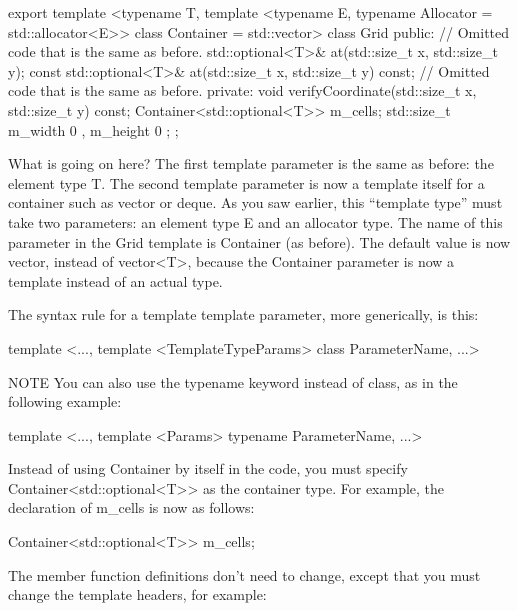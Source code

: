 \begin{cpp}
export template <typename T,
    template <typename E, typename Allocator = std::allocator<E>> class Container
        = std::vector>
class Grid
{
    public:
        // Omitted code that is the same as before.
        std::optional<T>& at(std::size_t x, std::size_t y);
        const std::optional<T>& at(std::size_t x, std::size_t y) const;
        // Omitted code that is the same as before.
    private:
        void verifyCoordinate(std::size_t x, std::size_t y) const;
        Container<std::optional<T>> m_cells;
        std::size_t m_width { 0 }, m_height { 0 };
};
\end{cpp}

What is going on here? The first template parameter is the same as before: the element type T. The second template parameter is now a template itself for a container such as vector or deque. As you saw earlier, this “template type” must take two parameters: an element type E and an allocator type. The name of this parameter in the Grid template is Container (as before). The default value is now vector, instead of vector<T>, because the Container parameter is now a template instead of an actual type.

The syntax rule for a template template parameter, more generically, is this:

\begin{cpp}
template <..., template <TemplateTypeParams> class ParameterName, ...>
\end{cpp}

\begin{myNotic}{NOTE}
You can also use the typename keyword instead of class, as in the following example:

\begin{cpp}
template <..., template <Params> typename ParameterName, ...>
\end{cpp}
\end{myNotic}

Instead of using Container by itself in the code, you must specify Container<std::optional<T>{}> as the container type. For example, the declaration of m\_cells is now as follows:

\begin{cpp}
Container<std::optional<T>> m_cells;
\end{cpp}

The member function definitions don’t need to change, except that you must change the template headers, for example:

